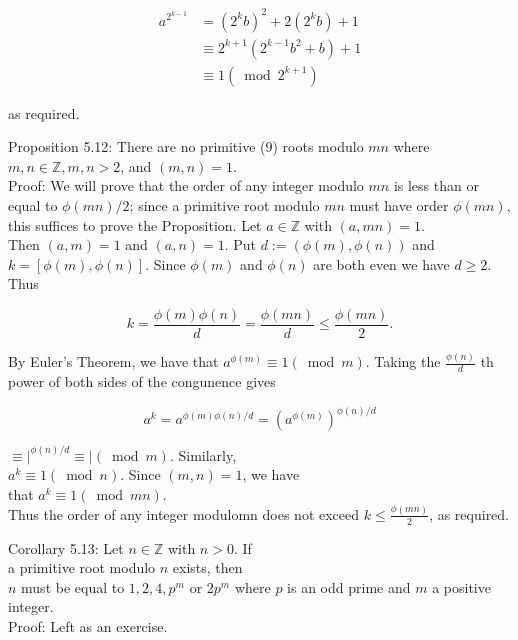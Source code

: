 \documentclass[10pt]{article}
\begin{document}
$$
\begin{aligned}
a^{2^{k-1}} & =\left(2^{k} b\right)^{2}+2\left(2^{k} b\right)+1 \\
& \equiv 2^{k+1}\left(2^{k-1} b^{2}+b\right)+1 \\
& \equiv 1\left(\bmod 2^{k+1}\right)
\end{aligned}
$$

as required.

Proposition 5.12: There are no primitive (9) roots modulo $m n$ where $m, n \in \mathbb{Z}, m, n>2$, and $(m, n)=1$.\\
Proof: We will prove that the order of any integer modulo $m n$ is less than or equal to $\phi(m n) / 2$; since a primitive root modulo $m n$ must have order $\phi(m n)$, this suffices to prove the Proposition. Let $a \in \mathbb{Z}$ with $(a, m n)=1$.\\
Then $(a, m)=1$ and $(a, n)=1$. Put $d:=(\phi(m), \phi(n))$ and $k=[\phi(m), \phi(n)]$. Since $\phi(m)$ and $\phi(n)$ are both even we have $d \geqslant 2$. Thus

$$
k=\frac{\phi(m) \phi(n)}{d}=\frac{\phi(m n)}{d} \leqslant \frac{\phi(m n)}{2} .
$$

By Euler's Theorem, we have that $a^{\phi(m)} \equiv 1(\bmod m)$. Taking the $\frac{\phi(n)}{d}$ th power of both sides of the congunence gives

$$
a^{k}=a^{\phi(m) \phi(n) / d}=\left(a^{\phi(m)}\right)^{\phi(n) / d}
$$

$\left.\equiv\right|^{\phi(n) / d} \equiv \mid(\bmod m)$. Similarly,\\
$a^{k} \equiv 1(\bmod n)$. Since $(m, n)=1$, we have\\
that $a^{k} \equiv 1(\bmod m n)$.\\
Thus the order of any integer modulomn does not exceed $k \leq \frac{\phi(m n)}{2}$, as required.

Corollary 5.13: Let $n \in \mathbb{Z}$ with $n>0$. If\\
a primitive root modulo $n$ exists, then\\
$n$ must be equal to $1,2,4, p^{m}$ or $2 p^{m}$ where $p$ is an odd prime and $m$ a positive\\
integer.\\
Proof: Left as an exercise.
\end{document}
